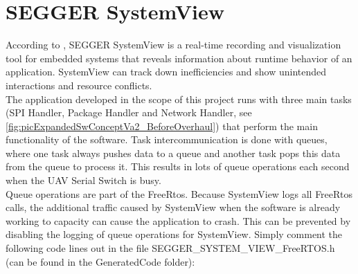\section{SEGGER SystemView}
According to \cite{SeggerSystemView}, SEGGER SystemView is a real-time recording and visualization tool for embedded systems that reveals information about runtime behavior of an application. SystemView can  track down inefficiencies and show unintended interactions and resource conflicts.\\
The application developed in the scope of this project runs with three main tasks (SPI Handler, Package Handler and Network Handler, see \autoref{fig:picExpandedSwConceptVa2_BeforeOverhaul}) that perform the main functionality of the software. Task intercommunication is done with queues, where one task always pushes data to a queue and another task pops this data from the queue to process it. This results in lots of queue operations each second when the UAV Serial Switch is busy.\\
Queue operations are part of the FreeRtos. Because SystemView logs all FreeRtos calls, the additional traffic caused by SystemView when the software is already working to capacity can cause the application to crash. This can be prevented by disabling the logging of queue operations for SystemView. Simply comment the following code lines out in the file SEGGER\_SYSTEM\_VIEW\_FreeRTOS.h (can be found in the GeneratedCode folder):\\
